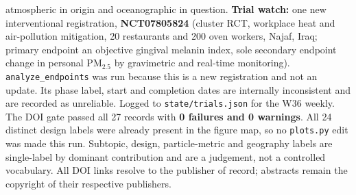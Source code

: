 \documentclass[10pt]{article}
\begin{document}
\begin{keybox}
{atmospheric in origin and oceanographic in question.
\textbf{Trial watch:} one new interventional registration, \textbf{NCT07805824} (cluster
RCT, workplace heat and air-pollution mitigation, 20 restaurants and 200 oven workers,
Najaf, Iraq; primary endpoint an objective gingival melanin index, sole secondary endpoint
change in personal PM$_{2.5}$ by gravimetric and real-time monitoring).
\texttt{analyze\_endpoints} was run because this is a new registration and not an update.
Its phase label, start and completion dates are internally inconsistent and are recorded as
unreliable. Logged to \texttt{state/trials.json} for the W36 weekly.
The DOI gate passed all 27 records with \textbf{0 failures and 0 warnings}. All 24 distinct
design labels were already present in the figure map, so no \texttt{plots.py} edit was made
this run.
Subtopic, design, particle-metric and geography labels are single-label by dominant
contribution and are a judgement, not a controlled vocabulary. All DOI links resolve to the
publisher of record; abstracts remain the copyright of their respective publishers.\par}
\end{keybox}
\end{document}
